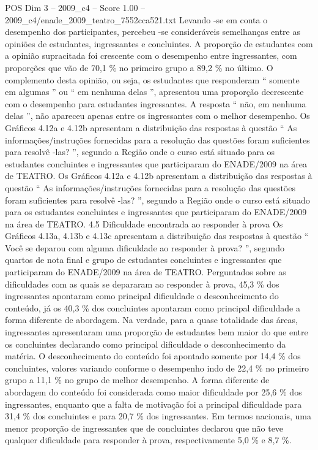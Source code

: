 \begin{textsample}{POS Dim 3 – 2009\_c4 – Score 1.00 – 2009\_c4/enade\_2009\_teatro\_7552cca521.txt}
Levando -se em conta o desempenho dos participantes, percebeu -se consideráveis semelhanças entre as opiniões de estudantes, ingressantes e concluintes.
A proporção de estudantes com a opinião supracitada foi crescente com o desempenho entre ingressantes, com proporções que vão de 70,1 \% no primeiro grupo a 89,2 \% no último.
O complemento desta opinião, ou seja, os estudantes que responderam “ somente em algumas ” ou “ em nenhuma delas ”, apresentou uma proporção decrescente com o desempenho para estudantes ingressantes.
A resposta “ não, em nenhuma delas ”, não apareceu apenas entre os ingressantes com o melhor desempenho.
Os Gráficos 4.12a e 4.12b apresentam a distribuição das respostas à questão “ As informações/instruções fornecidas para a resolução das questões foram suficientes para resolvê -las? ”, segundo a Região onde o curso está situado para os estudantes concluintes e ingressantes que participaram do ENADE/2009 na área de TEATRO.
Os Gráficos 4.12a e 4.12b apresentam a distribuição das respostas à questão “ As informações/instruções fornecidas para a resolução das questões foram suficientes para resolvê -las? ”, segundo a Região onde o curso está situado para os estudantes concluintes e ingressantes que participaram do ENADE/2009 na área de TEATRO. 4.5 Dificuldade encontrada ao responder à prova Os Gráficos 4.13a, 4.13b e 4.13c apresentam a distribuição das respostas à questão “ Você se deparou com alguma dificuldade ao responder à prova? ”, segundo quartos de nota final e grupo de estudantes concluintes e ingressantes que participaram do ENADE/2009 na área de TEATRO.
Perguntados sobre as dificuldades com as quais se depararam ao responder à prova, 45,3 \% dos ingressantes apontaram como principal dificuldade o desconhecimento do conteúdo, já os 40,3 \% dos concluintes apontaram como principal dificuldade a forma diferente de abordagem.
Na verdade, para a quase totalidade das áreas, ingressantes apresentaram uma proporção de estudantes bem maior do que entre os concluintes declarando como principal dificuldade o desconhecimento da matéria.
O desconhecimento do conteúdo foi apontado somente por 14,4 \% dos concluintes, valores variando conforme o desempenho indo de 22,4 \% no primeiro grupo a 11,1 \% no grupo de melhor desempenho.
A forma diferente de abordagem do conteúdo foi considerada como maior dificuldade por 25,6 \% dos ingressantes, enquanto que a falta de motivação foi a principal dificuldade para 31,4 \% dos concluintes e para 20,7 \% dos ingressantes.
Em termos nacionais, uma menor proporção de ingressantes que de concluintes declarou que não teve qualquer dificuldade para responder à prova, respectivamente 5,0 \% e 8,7 \%.

\end{textsample}
